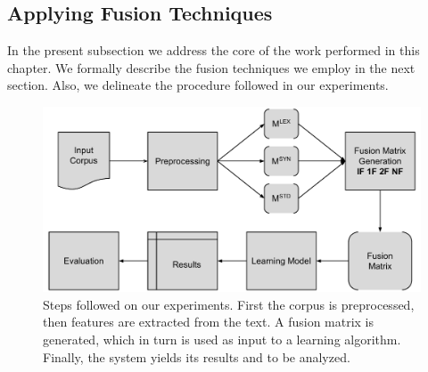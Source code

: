 

\subsection{Applying Fusion Techniques}
\label{chap6:application}
In the present subsection we address the core of the work performed in this chapter.
We formally describe the fusion techniques we employ in the next section. Also, we  delineate the procedure followed in our experiments. 





\begin{figure}[t]
\centering
\caption{Steps followed on our experiments. First the corpus is preprocessed, then features are extracted from the text. A fusion matrix is generated, which in turn is used as input to a learning algorithm. Finally, the system yields its results and to be analyzed.}
\includegraphics[width=0.85\linewidth]{images/Chapitre6/diag_metodo.pdf}

\label{fig:diagmetodo}
\end{figure}

